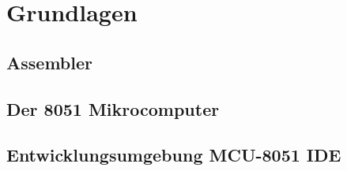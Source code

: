 \chapter{Grundlagen}

\section{Assembler}

\section{Der 8051 Mikrocomputer}

\section{Entwicklungsumgebung MCU-8051 IDE}
